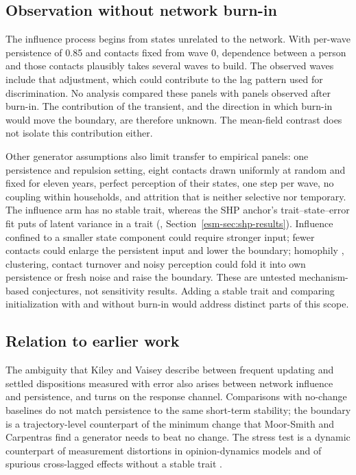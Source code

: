 \subsection{Observation without network burn-in}\label{sec:disc-initialization}

The influence process begins from states unrelated to the network. With per-wave persistence of 0.85 and contacts fixed from wave 0, dependence between a person and those contacts plausibly takes several waves to build. The observed waves include that adjustment, which could contribute to the lag pattern used for discrimination. No analysis compared these panels with panels observed after burn-in. The contribution of the transient, and the direction in which burn-in would move the boundary, are therefore unknown. The mean-field contrast does not isolate this contribution either.

Other generator assumptions also limit transfer to empirical panels: one persistence and repulsion setting, eight contacts drawn uniformly at random and fixed for eleven years, perfect perception of their states, one step per wave, no coupling within households, and attrition that is neither selective nor temporary. The influence arm has no stable trait, whereas the SHP anchor's trait--state--error fit puts  of latent variance in a trait (\esmresource, Section~\ref{esm-sec:shp-results}). Influence confined to a smaller state component could require stronger input; fewer contacts could enlarge the persistent input and lower the boundary; homophily \cite{mcpherson2001}, clustering, contact turnover and noisy perception could fold it into own persistence or fresh noise and raise the boundary. These are untested mechanism-based conjectures, not sensitivity results. Adding a stable trait and comparing initialization with and without burn-in would address distinct parts of this scope.

\subsection{Relation to earlier work}\label{sec:disc-literature}

The ambiguity that Kiley and Vaisey describe between frequent updating and settled dispositions measured with error \cite{kiley2020} also arises between network influence and persistence, and turns on the response channel. Comparisons with no-change baselines \cite{moor2026,coding2024} do not match persistence to the same short-term stability; the boundary is a trajectory-level counterpart of the minimum change that Moor-Smith and Carpentras find a generator needs to beat no change. The stress test is a dynamic counterpart of measurement distortions in opinion-dynamics models \cite{carpentras2022,carpentras2023} and of spurious cross-lagged effects without a stable trait \cite{lucas2023}.

